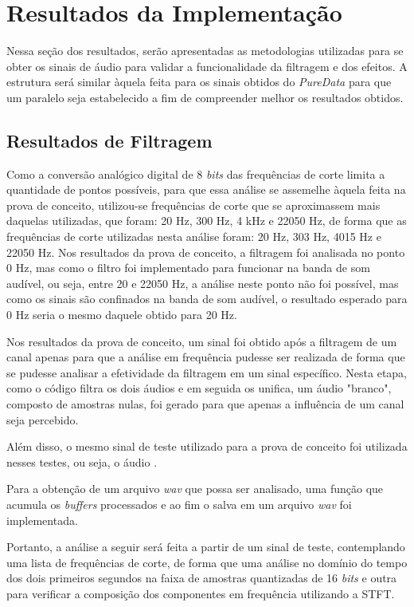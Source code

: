 \section{Resultados da Implementação}

Nessa seção dos resultados, serão apresentadas as metodologias utilizadas para se obter os sinais de áudio para validar a funcionalidade da filtragem e dos efeitos. A estrutura será similar àquela feita para os sinais obtidos do \textit{PureData} para que um paralelo seja estabelecido a fim de compreender melhor os resultados obtidos.

\subsection{Resultados de Filtragem}

Como a conversão analógico digital de 8 \textit{bits} das frequências de corte limita a quantidade de pontos possíveis, para que essa análise se assemelhe àquela feita na prova de conceito, utilizou-se frequências de corte que se aproximassem mais daquelas utilizadas, que foram: 20 Hz, 300 Hz, 4 kHz e 22050 Hz, de forma que as frequências de corte utilizadas nesta análise foram: 20 Hz, 303 Hz, 4015 Hz e 22050 Hz. Nos resultados da prova de conceito, a filtragem foi analisada no ponto 0 Hz, mas como o filtro foi implementado para funcionar na banda de som audível, ou seja, entre 20 e 22050 Hz, a análise neste ponto não foi possível, mas como os sinais são confinados na banda de som audível, o resultado esperado para 0 Hz seria o mesmo daquele obtido para 20 Hz. 

Nos resultados da prova de conceito, um sinal foi obtido após a filtragem de um canal apenas para que a análise em frequência pudesse ser realizada de forma que se pudesse analisar a efetividade da filtragem em um sinal específico. Nesta etapa, como o código filtra os dois áudios e em seguida os unifica, um áudio "branco", composto de amostras nulas, foi gerado para que apenas a influência de um canal seja percebido. 

Além disso, o mesmo sinal de teste utilizado para a prova de conceito foi utilizada nesses testes, ou seja, o áudio \cite{track01}.

Para a obtenção de um arquivo \textit{wav} que possa ser analisado, uma função que acumula os \textit{buffers} processados e ao fim o salva em um arquivo \textit{wav} foi implementada.

Portanto, a análise a seguir será feita a partir de um sinal de teste, contemplando uma lista de frequências de corte, de forma que uma análise no domínio do tempo dos dois primeiros segundos na faixa de amostras quantizadas de 16 \textit{bits} e outra para verificar a composição dos componentes em frequência utilizando a STFT. 

